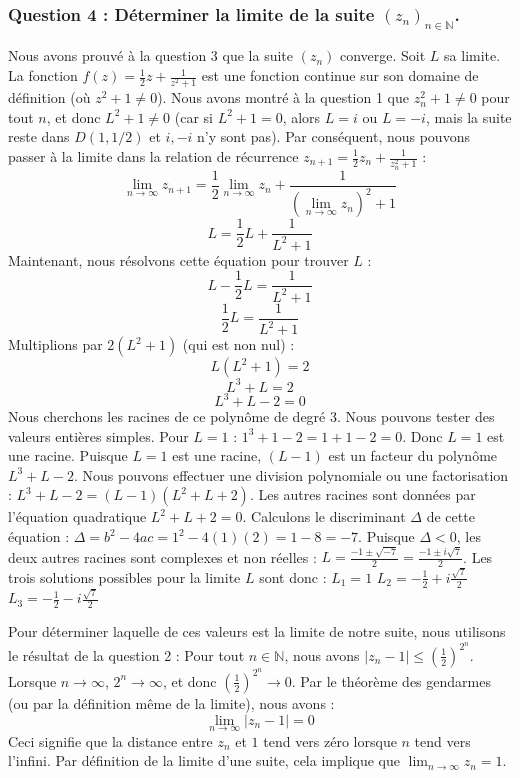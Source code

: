 \documentclass[a4paper,11pt]{report}
\begin{document}
\subsubsection*{Question 4 : Déterminer la limite de la suite $(z_n)_{n \in \mathbb{N}}$.}

Nous avons prouvé à la question 3 que la suite $(z_n)$ converge. Soit $L$ sa limite.
La fonction $f(z) = \frac{1}{2}z + \frac{1}{z^2+1}$ est une fonction continue sur son domaine de définition (où $z^2+1 \neq 0$). Nous avons montré à la question 1 que $z_n^2+1 \neq 0$ pour tout $n$, et donc $L^2+1 \neq 0$ (car si $L^2+1=0$, alors $L=i$ ou $L=-i$, mais la suite reste dans $D(1, 1/2)$ et $i, -i$ n'y sont pas).
Par conséquent, nous pouvons passer à la limite dans la relation de récurrence $z_{n+1} = \frac{1}{2} z_n + \frac{1}{z_n^2+1}$ :
$$\lim_{n \to \infty} z_{n+1} = \frac{1}{2} \lim_{n \to \infty} z_n + \frac{1}{(\lim_{n \to \infty} z_n)^2+1}$$
$$L = \frac{1}{2} L + \frac{1}{L^2+1}$$
Maintenant, nous résolvons cette équation pour trouver $L$ :
$$L - \frac{1}{2} L = \frac{1}{L^2+1}$$
$$\frac{1}{2} L = \frac{1}{L^2+1}$$
Multiplions par $2(L^2+1)$ (qui est non nul) :
$$L(L^2+1) = 2$$
$$L^3 + L = 2$$
$$L^3 + L - 2 = 0$$
Nous cherchons les racines de ce polynôme de degré 3. Nous pouvons tester des valeurs entières simples.
Pour $L=1$ : $1^3 + 1 - 2 = 1 + 1 - 2 = 0$. Donc $L=1$ est une racine.
Puisque $L=1$ est une racine, $(L-1)$ est un facteur du polynôme $L^3+L-2$. Nous pouvons effectuer une division polynomiale ou une factorisation :
$L^3 + L - 2 = (L-1)(L^2+L+2)$.
Les autres racines sont données par l'équation quadratique $L^2+L+2=0$.
Calculons le discriminant $\Delta$ de cette équation :
$\Delta = b^2 - 4ac = 1^2 - 4(1)(2) = 1 - 8 = -7$.
Puisque $\Delta < 0$, les deux autres racines sont complexes et non réelles :
$L = \frac{-1 \pm \sqrt{-7}}{2} = \frac{-1 \pm i\sqrt{7}}{2}$.
Les trois solutions possibles pour la limite $L$ sont donc :
$L_1 = 1$
$L_2 = -\frac{1}{2} + i\frac{\sqrt{7}}{2}$
$L_3 = -\frac{1}{2} - i\frac{\sqrt{7}}{2}$

Pour déterminer laquelle de ces valeurs est la limite de notre suite, nous utilisons le résultat de la question 2 :
Pour tout $n \in \mathbb{N}$, nous avons $|z_n - 1| \le \left(\frac{1}{2}\right)^{2^n}$.
Lorsque $n \to \infty$, $2^n \to \infty$, et donc $\left(\frac{1}{2}\right)^{2^n} \to 0$.
Par le théorème des gendarmes (ou par la définition même de la limite), nous avons :
$$\lim_{n \to \infty} |z_n - 1| = 0$$
Ceci signifie que la distance entre $z_n$ et $1$ tend vers zéro lorsque $n$ tend vers l'infini. Par définition de la limite d'une suite, cela implique que $\lim_{n \to \infty} z_n = 1$.
\end{document}
